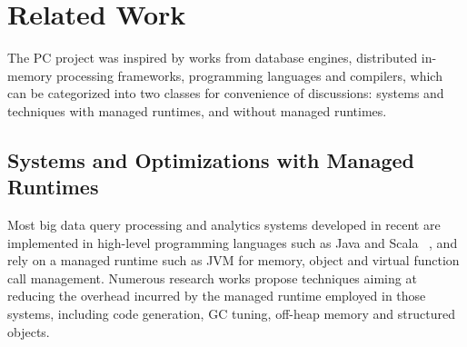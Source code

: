 
\section{Related Work}

The PC project was inspired by works from database engines, distributed in-memory processing
frameworks,  programming languages and compilers, which can be
categorized into two classes for convenience of discussions: systems and techniques with managed
runtimes, and without managed runtimes.


\subsection {Systems and Optimizations with Managed Runtimes}

Most big data query processing and analytics
systems developed in recent are implemented in
high-level programming languages such as Java and Scala  ~\cite{dean2008mapreduce, yu2008dryadlinq,
  neumann2011efficiently, zaharia2012resilient,
  alexandrov2014stratosphere, klonatos2014building,
  crotty2015tupleware, armbrust2015spark}, and rely on a managed
runtime such as JVM for memory, object and virtual function call management. Numerous research
works propose techniques aiming at
reducing the overhead incurred by the managed runtime employed in
those systems, including code generation, GC tuning, off-heap memory and structured objects.


